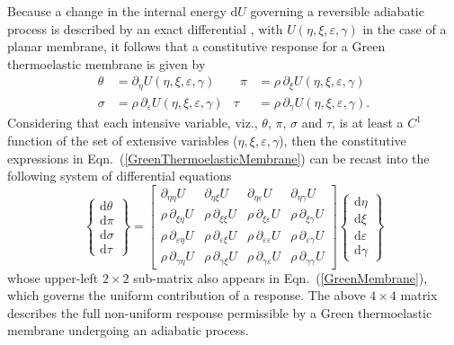 Because a change in the internal energy $\mathrm{d} U$ governing a reversible adiabatic process is described by an exact differential \cite{Caratheodory09}, with $U( \eta, \xi, \varepsilon, \gamma )$ in the case of a planar membrane, it follows that a constitutive response for a Green thermo\-elastic membrane is given by
\begin{equation}
    \begin{aligned}
    \theta & = \partial_{\eta} U(\eta, \xi, \varepsilon, \gamma) &
    \phantom{\rho}
    \pi & = \rho \, \partial_{\xi} U(\eta, \xi, \varepsilon, \gamma)  \\
    \sigma & = \rho \, \partial_{\varepsilon} U(\eta, \xi, \varepsilon, \gamma) &
    \tau & = \rho \, \partial_{\gamma} U(\eta, \xi, \varepsilon, \gamma) .
    \end{aligned}
    \label{GreenThermoelasticMembrane}
\end{equation}
Considering that each intensive variable, viz., $\theta$, $\pi$, $\sigma$ and $\tau$, is at least a $C^1$ function of the set of extensive variables ($\eta , \xi , \varepsilon , \gamma$), then the constitutive expressions in Eqn.~(\ref{GreenThermoelasticMembrane}) can be recast into the following system of differential equations
\begin{equation}
\label{energies2D}
\left\{ \begin{matrix}
\mathrm{d} \theta \\ \mathrm{d} \pi \\
\mathrm{d} \sigma \\ \mathrm{d} \tau
\end{matrix} \right\} = \begin{bmatrix}
\partial_{\eta\eta} U & 
\partial_{\eta\xi} U & 
\partial_{\eta\varepsilon} U & 
\partial_{\eta\gamma} U \\ 
\rho \, \partial_{\xi\eta} U & 
\rho \, \partial_{\xi\xi} U & 
\rho \, \partial_{\xi\varepsilon} U &
\rho \, \partial_{\xi\gamma} U \\
\rho \, \partial_{\varepsilon\eta} U & 
\rho \, \partial_{\varepsilon\xi} U & 
\rho \, \partial_{\varepsilon\varepsilon} U & 
\rho \, \partial_{\varepsilon\gamma} U \\
\rho \, \partial_{\gamma\eta} U & 
\rho \, \partial_{\gamma\xi} U & 
\rho \, \partial_{\gamma\varepsilon} U & 
\rho \, \partial_{\gamma\gamma} U 
\end{bmatrix} 
\left\{ \begin{matrix}
\mathrm{d}\eta \\ \mathrm{d} \xi \\
\mathrm{d} \varepsilon \\ \mathrm{d} \gamma
\end{matrix} \right\}  
\end{equation}
whose upper-left $2\times 2$ sub-matrix also appears in Eqn.~(\ref{GreenMembrane}), which governs the uniform contribution of a response.  The above $4 \times 4$ matrix describes the full non-uniform response permissible by a Green thermo\-elastic membrane undergoing an adiabatic process.

